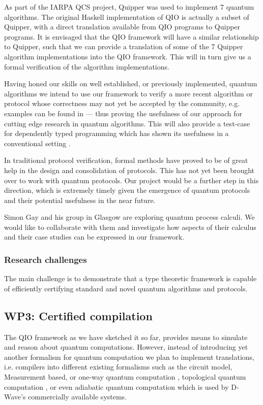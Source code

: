 \documentclass[a4paper]{article}
\begin{document}
As part of the IARPA QCS project, Quipper was used to implement 7
quantum algorithms. The original Haskell implementation of QIO is
actually a subset of Quipper, with a direct translation available from
QIO programs to Quipper programs. It is envisaged that the QIO
framework will have a similar relationship to Quipper, such that we
can provide a translation of some of the 7 Quipper algorithm
implementations into the QIO framework. This will in turn give us a
formal verification of the algorithm implementations. 

Having honed our skills on well established, or previously
implemented, quantum algorithms we intend to use our framework to
verify a more recent algorithm or protocol whose correctness may not
yet be accepted by the community, e.g.  examples can be found in
 --- thus proving the usefulness of our approach for
cutting edge research in quantum algorithms. This will also provide a
test-case for dependently typed programming which has shown its
usefulness in a conventional setting
.

In traditional protocol verification, formal methods have proved to be
of great help in the design and  consolidation of protocols. This has
not yet been brought over to work with quantum protocols. Our project
would be a further step in this direction, which is extremely timely
given the emergence of quantum protocols and their potential
usefulness in the near future.

Simon Gay and his group in Glasgow are exploring quantum process
calculi. We would like to collaborate with them and investigate how
aspects of their calculus and their case studies can be expressed in
our framework.

\subsubsection*{Research challenges}

The main challenge is to demonstrate that a type theoretic framework
is capable of efficiently certifying standard and novel quantum
algorithms and protocols. 

\subsection*{WP3: Certified compilation}
\label{sec:wp3}

The QIO framework as we have sketched it so far, provides means to
simulate and reason about quantum computations. However, instead of
introducing yet another formalism for quantum computation we plan to
implement translations, i.e. compilers into different existing
formalisms such as the circuit model, Measurement based, or one-way
quantum computation , topological quantum
computation , or even adiabatic quantum
computation  which is used by D-Wave's
commercially available systems.
\end{document}

